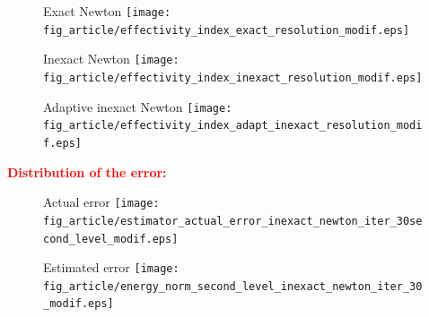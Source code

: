 \documentclass[10 pt]{beamer}
\begin{document}
\begin{frame}
\begin{figure}
\begin{minipage}[c]{.33\linewidth}
   \centering
   Exact  Newton 
\texttt{[image: fig\_article/effectivity\_index\_exact\_resolution\_modif.eps]}    
\end{minipage}\hfill
\begin{minipage}[c]{.32\linewidth}
   \centering
   Inexact  Newton 
\texttt{[image: fig\_article/effectivity\_index\_inexact\_resolution\_modif.eps]}     
\end{minipage}\hfill
\begin{minipage}[c]{.33\linewidth}
   \centering
   Adaptive inexact  Newton 
\texttt{[image: fig\_article/effectivity\_index\_adapt\_inexact\_resolution\_modif.eps]}     
\end{minipage} \hfill
\end{figure}

\textcolor{red}{\textbf{Distribution of the error:}}
\begin{figure}[H]
\begin{minipage}[c]{.40\linewidth}
   \centering
   Actual error
\texttt{[image: fig\_article/estimator\_actual\_error\_inexact\_newton\_iter\_30second\_level\_modif.eps]}    
\end{minipage}\hfill
\begin{minipage}[c]{.40\linewidth}
   \centering
   Estimated error
\texttt{[image: fig\_article/energy\_norm\_second\_level\_inexact\_newton\_iter\_30\_modif.eps]}     
\end{minipage}\hfill
\end{figure}



\end{frame}
\end{document}
